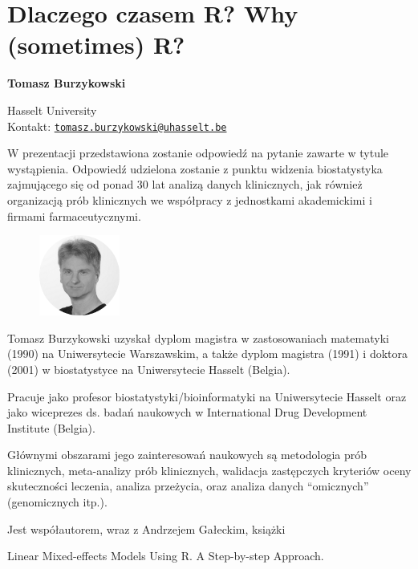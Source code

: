 \documentclass[\main/boa.tex]{subfiles}
\begin{document}
\section{Dlaczego czasem R? Why (sometimes) R?}


\begin{minipage}{0.915\textwidth}
	\centering
  {\bf \LARGE {} Tomasz Burzykowski}
\end{minipage}

\begin{affiliations}
\begin{minipage}{0.915\textwidth}
\centering
\large Hasselt University   \\[1pt]
Kontakt: \href{mailto:tomasz.burzykowski@uhasselt.be}{\nolinkurl{tomasz.burzykowski@uhasselt.be}}\\
\end{minipage}
\end{affiliations}


W prezentacji przedstawiona zostanie odpowiedź na pytanie zawarte w tytule wystąpienia. Odpowiedź udzielona zostanie z punktu widzenia biostatystyka zajmującego się od ponad 30 lat analizą danych klinicznych, jak również organizacją prób klinicznych we współpracy z jednostkami akademickimi i firmami farmaceutycznymi. 

\bio
\begin{figure}
    \includegraphics[width=100px]{img/guests/czarno_biale/tburzykowski.png}
\end{figure} 
Tomasz Burzykowski uzyskał dyplom magistra w zastosowaniach matematyki (1990) na Uniwersytecie Warszawskim, a także dyplom magistra (1991) i doktora (2001) w biostatystyce na Uniwersytecie Hasselt (Belgia).

Pracuje jako profesor biostatystyki/bioinformatyki na Uniwersytecie Hasselt oraz jako wiceprezes ds. badań naukowych w International Drug Development Institute (Belgia).

Głównymi obszarami jego zainteresowań naukowych są metodologia prób klinicznych, meta-analizy prób klinicznych, walidacja zastępczych kryteriów oceny skuteczności leczenia, analiza przeżycia, oraz analiza danych “omicznych” (genomicznych itp.).

Jest współautorem, wraz z Andrzejem Gałeckim, książki

Linear Mixed-effects Models Using R. A Step-by-step Approach.
\end{document}
